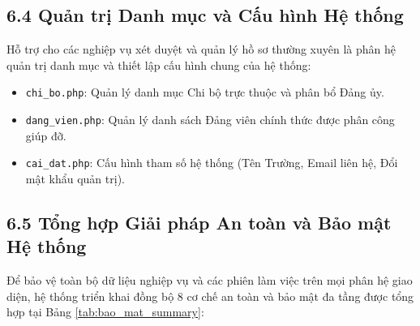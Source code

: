 \documentclass[12pt,a4paper]{report}
\begin{document}
\subsection*{6.4 Quản trị Danh mục và Cấu hình Hệ thống}
Hỗ trợ cho các nghiệp vụ xét duyệt và quản lý hồ sơ thường xuyên là phân hệ quản trị danh mục và thiết lập cấu hình chung của hệ thống:
\begin{itemize}[label=--,leftmargin=*]
  \item \texttt{chi\_bo.php}: Quản lý danh mục Chi bộ trực thuộc và phân bổ Đảng ủy.
  \item \texttt{dang\_vien.php}: Quản lý danh sách Đảng viên chính thức được phân công giúp đỡ.
  \item \texttt{cai\_dat.php}: Cấu hình tham số hệ thống (Tên Trường, Email liên hệ, Đổi mật khẩu quản trị).
\end{itemize}

\subsection*{6.5 Tổng hợp Giải pháp An toàn và Bảo mật Hệ thống}
Để bảo vệ toàn bộ dữ liệu nghiệp vụ và các phiên làm việc trên mọi phân hệ giao diện, hệ thống triển khai đồng bộ 8 cơ chế an toàn và bảo mật đa tầng được tổng hợp tại Bảng \ref{tab:bao_mat_summary}:
\end{document}
